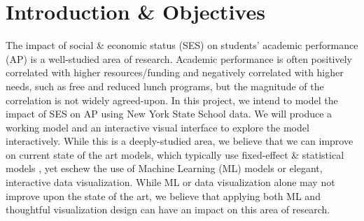 \documentclass[sigconf,nonacm,11pt]{acmart}
\begin{document}
\section{Introduction \& Objectives}

The impact of  social \& economic status (SES) on students' academic performance (AP) is a well-studied area of research.  Academic performance is often positively correlated with higher resources/funding \cite{jinnai}and negatively correlated with higher needs, such as free and reduced lunch programs\cite{sirin}, but the magnitude of the correlation is not widely agreed-upon. In this project, we intend to model the impact of SES on AP using New York State School data. We will produce a working model and an interactive visual interface to explore the model interactively. While this is a deeply-studied area, we believe that we can improve on current state of the art models, which typically use fixed-effect \& statistical models \cite{hearn, farooq}, yet eschew the use of Machine Learning (ML) models or elegant, interactive data visualization. While ML or data visualization alone may not improve upon the state of the art, we believe that applying both ML and thoughtful visualization design can have an impact on this area of research.




\end{document}
